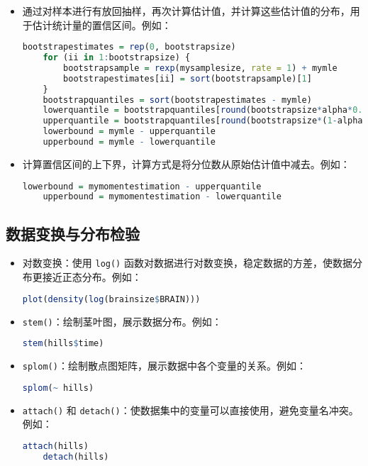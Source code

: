 \documentclass[UTF8]{report}
\theoremstyle{MyLineTheoremStyle} %
\theoremstyle{MyBlockTheoremStyle} %
\theoremstyle{MySubsubsectionStyle} %
\begin{document}
\begin{itemize}
    \item 通过对样本进行有放回抽样，再次计算估计值，并计算这些估计值的分布，用于估计统计量的置信区间。例如：
    \begin{lstlisting}[language=R]
    bootstrapestimates = rep(0, bootstrapsize)
    for (ii in 1:bootstrapsize) {
        bootstrapsample = rexp(mysamplesize, rate = 1) + mymle
        bootstrapestimates[ii] = sort(bootstrapsample)[1]
    }
    bootstrapquantiles = sort(bootstrapestimates - mymle)
    lowerquantile = bootstrapquantiles[round(bootstrapsize*alpha*0.5)]
    upperquantile = bootstrapquantiles[round(bootstrapsize*(1-alpha*0.5))]
    lowerbound = mymle - upperquantile
    upperbound = mymle - lowerquantile
    \end{lstlisting}
    \item 计算置信区间的上下界，计算方式是将分位数从原始估计值中减去。例如：
    \begin{lstlisting}[language=R]
    lowerbound = mymomentestimation - upperquantile
    upperbound = mymomentestimation - lowerquantile
    \end{lstlisting}
\end{itemize}

\subsection*{数据变换与分布检验}

\begin{itemize}
    \item 对数变换：使用 \texttt{log()} 函数对数据进行对数变换，稳定数据的方差，使数据分布更接近正态分布。例如：
    \begin{lstlisting}[language=R]
    plot(density(log(brainsize$BRAIN)))
    \end{lstlisting}
    \item \texttt{stem()}：绘制茎叶图，展示数据分布。例如：
    \begin{lstlisting}[language=R]
    stem(hills$time)
    \end{lstlisting}
    \item \texttt{splom()}：绘制散点图矩阵，展示数据中各个变量的关系。例如：
    \begin{lstlisting}[language=R]
    splom(~ hills)
    \end{lstlisting}
    \item \texttt{attach()} 和 \texttt{detach()}：使数据集中的变量可以直接使用，避免变量名冲突。例如：
    \begin{lstlisting}[language=R]
    attach(hills)
    detach(hills)
    \end{lstlisting}
\end{itemize}
\end{document}
